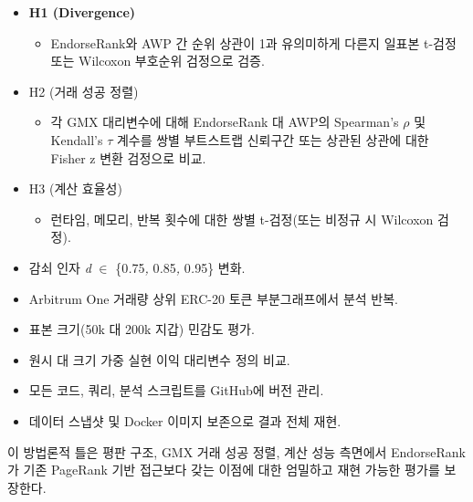 \begin{itemize}
\item[\textbullet] \textbf{H1 (Divergence)}
\begin{itemize}
\item[\textendash] EndorseRank와 AWP 간 순위 상관이 1과 유의미하게 다른지 일표본 t-검정 또는 Wilcoxon 부호순위 검정으로 검증.
\end{itemize}
\item[\textbullet] H2 (거래 성공 정렬)
\begin{itemize}
\item[\textendash] 각 GMX 대리변수에 대해 EndorseRank 대 AWP의 Spearman's \emph{\(\rho\)} 및 Kendall's \emph{\(\tau\)} 계수를 쌍별 부트스트랩 신뢰구간 또는 상관된 상관에 대한 Fisher z 변환 검정으로 비교.
\end{itemize}
\item[\textbullet] H3 (계산 효율성)
\begin{itemize}
\item[\textendash] 런타임, 메모리, 반복 횟수에 대한 쌍별 t-검정(또는 비정규 시 Wilcoxon 검정).
\end{itemize}
\end{itemize}

\begin{itemize}
\item[\textbullet] 감쇠 인자 \emph{d }\(\in\) \{0\emph{.}75\emph{, }0\emph{.}85\emph{, }0\emph{.}95\} 변화.
\item[\textbullet] Arbitrum One 거래량 상위 ERC-20 토큰 부분그래프에서 분석 반복.
\item[\textbullet] 표본 크기(50k 대 200k 지갑) 민감도 평가.
\item[\textbullet] 원시 대 크기 가중 실현 이익 대리변수 정의 비교.
\end{itemize}

\begin{itemize}
\item[\textbullet] 모든 코드, 쿼리, 분석 스크립트를 GitHub에 버전 관리.
\item[\textbullet] 데이터 스냅샷 및 Docker 이미지 보존으로 결과 전체 재현.
\end{itemize}
이 방법론적 틀은 평판 구조, GMX 거래 성공 정렬, 계산 성능 측면에서 EndorseRank가 기존 PageRank 기반 접근보다 갖는 이점에 대한 엄밀하고 재현 가능한 평가를 보장한다.
